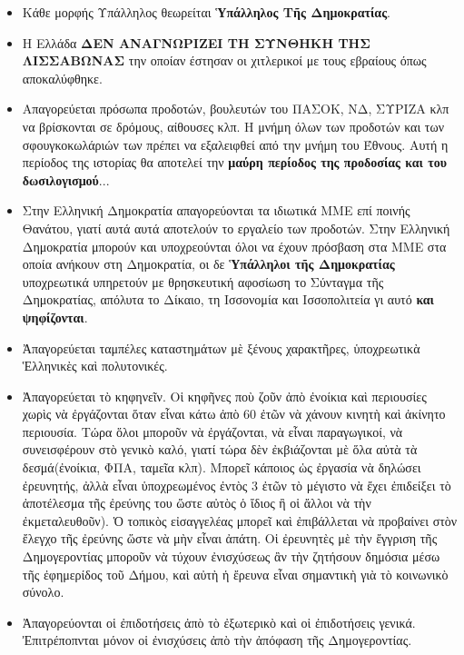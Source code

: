 \documentclass[a4paper]{article}
\begin{document}
\begin{itemize}
\item Κάθε μορφής Υπάλληλος θεωρείται \textbf{Ὑπάλληλος Τῆς Δημοκρατίας}.
\item Η Ελλάδα \textbf{ΔΕΝ ΑΝΑΓΝΩΡΙΖΕΙ ΤΗ ΣΥΝΘΗΚΗ ΤΗΣ ΛΙΣΣΑΒΩΝΑΣ} την οποίαν έστησαν οι χιτλερικοί με τους εβραίους όπως αποκαλύφθηκε.
\item Απαγορεύεται πρόσωπα προδοτών, βουλευτών του ΠΑΣΟΚ, ΝΔ, ΣΥΡΙΖΑ κλπ να βρίσκονται σε δρόμους, αίθουσες κλπ. Η μνήμη όλων των προδοτών και των σφουγκοκωλάριών των πρέπει να εξαλειφθεί από την μνήμη του Έθνους. Αυτή η περίοδος της ιστορίας θα αποτελεί την \textbf{μαύρη περίοδος της προδοσίας και του δωσιλογισμού}...
\item Στην Ελληνική Δημοκρατία απαγορεύονται τα ιδιωτικά ΜΜΕ επί ποινής Θανάτου, γιατί αυτά αυτά αποτελούν το εργαλείο των προδοτών. Στην Ελληνική Δημοκρατία μπορούν και υποχρεούνται όλοι να έχουν πρόσβαση στα ΜΜΕ στα οποία ανήκουν στη Δημοκρατία, οι δε \textbf{Ὑπάλληλοι τῆς Δημοκρατίας} υποχρεωτικά υπηρετούν με θρησκευτική αφοσίωση το Σύνταγμα τῆς Δημοκρατίας, απόλυτα το Δίκαιο, τη Ισσονομία και Ισσοπολιτεία γι αυτό \textbf{και ψηφίζονται}.
\item Ἀπαγορεύεται ταμπέλες καταστημάτων μὲ ξένους χαρακτῆρες, ὑποχρεωτικὰ Ἑλληνικὲς καὶ πολυτονικές.
\item Ἀπαγορεύεται τὸ κηφηνεῖν. Οἱ κηφῆνες ποὺ ζοῦν ἀπὸ ἐνοίκια καὶ περιουσίες χωρὶς νὰ ἐργάζονται ὅταν εἶναι κάτω ἀπὸ 60 ἐτῶν νὰ χάνουν κινητὴ καὶ ἀκίνητο περιουσία. Τώρα ὅλοι μποροῦν νὰ ἐργάζονται, νὰ εἶναι παραγωγικοί, νὰ συνεισφέρουν στὸ γενικὸ καλό, γιατί τώρα δὲν ἐκβιάζονται μὲ ὅλα αὐτὰ τὰ δεσμά(ἐνοίκια, ΦΠΑ, ταμεῖα κλπ). Μπορεῖ κάποιος ὡς ἐργασία νὰ δηλώσει ἐρευνητής, ἀλλὰ εἶναι ὑποχρεωμένος ἐντὸς 3 ἐτῶν τὸ μέγιστο νὰ ἔχει ἐπιδείξει τὸ ἀποτέλεσμα τῆς ἐρεύνης του ὥστε αὐτὸς ὁ ἴδιος ἢ οἱ ἄλλοι νὰ τὴν ἐκμεταλευθοῦν). Ὁ τοπικὸς εἰσαγγελέας μπορεῖ καὶ ἐπιβάλλεται νὰ προβαίνει στὸν ἔλεγχο τῆς ἐρεύνης ὥστε νὰ μὴν εἶναι ἀπάτη. Οἱ ἐρευνητὲς μὲ τὴν ἔγγριση τῆς Δημογεροντίας μποροῦν νὰ τύχουν ἐνισχύσεως ἂν τὴν ζητήσουν δημόσια μέσω τῆς ἐφημερίδος τοῦ Δήμου, καὶ αὐτὴ ἡ ἔρευνα εἶναι σημαντικὴ γιὰ τὸ κοινωνικὸ σύνολο.
\item Ἀπαγορεύονται οἱ ἐπιδοτήσεις ἀπὸ τὸ ἐξωτερικὸ καὶ οἱ ἐπιδοτήσεις γενικά. Ἐπιτρέποπνται μόνον οἱ ἐνισχύσεις ἀπὸ τὴν ἀπόφαση τῆς Δημογεροντίας.

\end{itemize}
\end{document}
